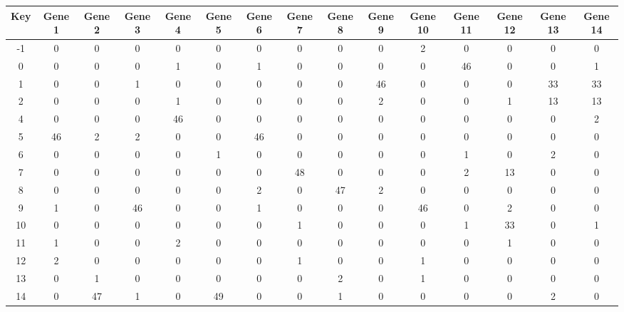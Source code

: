 \begin{tabular}{|c|c|c|c|c|c|c|c|c|c|c|c|c|c|c|}
\hline
Key & Gene 1 & Gene 2 & Gene 3 & Gene 4 & Gene 5 & Gene 6 & Gene 7 & Gene 8 & Gene 9 & Gene 10 & Gene 11 & Gene 12 & Gene 13 & Gene 14 \\
\hline
-1 & 0 & 0 & 0 & 0 & 0 & 0 & 0 & 0 & 0 & 2 & 0 & 0 & 0 & 0 \\
0 & 0 & 0 & 0 & 1 & 0 & 1 & 0 & 0 & 0 & 0 & 46 & 0 & 0 & 1 \\
1 & 0 & 0 & 1 & 0 & 0 & 0 & 0 & 0 & 46 & 0 & 0 & 0 & 33 & 33 \\
2 & 0 & 0 & 0 & 1 & 0 & 0 & 0 & 0 & 2 & 0 & 0 & 1 & 13 & 13 \\
4 & 0 & 0 & 0 & 46 & 0 & 0 & 0 & 0 & 0 & 0 & 0 & 0 & 0 & 2 \\
5 & 46 & 2 & 2 & 0 & 0 & 46 & 0 & 0 & 0 & 0 & 0 & 0 & 0 & 0 \\
6 & 0 & 0 & 0 & 0 & 1 & 0 & 0 & 0 & 0 & 0 & 1 & 0 & 2 & 0 \\
7 & 0 & 0 & 0 & 0 & 0 & 0 & 48 & 0 & 0 & 0 & 2 & 13 & 0 & 0 \\
8 & 0 & 0 & 0 & 0 & 0 & 2 & 0 & 47 & 2 & 0 & 0 & 0 & 0 & 0 \\
9 & 1 & 0 & 46 & 0 & 0 & 1 & 0 & 0 & 0 & 46 & 0 & 2 & 0 & 0 \\
10 & 0 & 0 & 0 & 0 & 0 & 0 & 1 & 0 & 0 & 0 & 1 & 33 & 0 & 1 \\
11 & 1 & 0 & 0 & 2 & 0 & 0 & 0 & 0 & 0 & 0 & 0 & 1 & 0 & 0 \\
12 & 2 & 0 & 0 & 0 & 0 & 0 & 1 & 0 & 0 & 1 & 0 & 0 & 0 & 0 \\
13 & 0 & 1 & 0 & 0 & 0 & 0 & 0 & 2 & 0 & 1 & 0 & 0 & 0 & 0 \\
14 & 0 & 47 & 1 & 0 & 49 & 0 & 0 & 1 & 0 & 0 & 0 & 0 & 2 & 0 \\
\hline
\end{tabular}